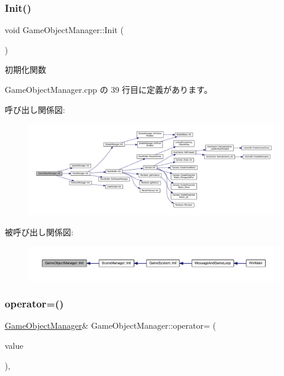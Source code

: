 \subsubsection{\texorpdfstring{Init()}{Init()}}
{\footnotesize\ttfamily void Game\+Object\+Manager\+::\+Init (\begin{DoxyParamCaption}{ }\end{DoxyParamCaption})\hspace{0.3cm}{\ttfamily [static]}}



初期化関数 



 Game\+Object\+Manager.\+cpp の 39 行目に定義があります。

呼び出し関係図\+:
\nopagebreak
\begin{figure}[H]
\begin{center}
\leavevmode
\includegraphics[width=350pt]{class_game_object_manager_abda84aa3b4c79090c43243f93b5a9c46_cgraph}
\end{center}
\end{figure}
被呼び出し関係図\+:
\nopagebreak
\begin{figure}[H]
\begin{center}
\leavevmode
\includegraphics[width=350pt]{class_game_object_manager_abda84aa3b4c79090c43243f93b5a9c46_icgraph}
\end{center}
\end{figure}
\mbox{\label{class_game_object_manager_af66275734b2098dc631fdb789d31fd52}} 
\subsubsection{\texorpdfstring{operator=()}{operator=()}}
{\footnotesize\ttfamily \mbox{\hyperlink{class_game_object_manager}{Game\+Object\+Manager}}\& Game\+Object\+Manager\+::operator= (\begin{DoxyParamCaption}\item[{const \mbox{\hyperlink{class_game_object_manager}{Game\+Object\+Manager}} \&}]{value }\end{DoxyParamCaption})\hspace{0.3cm}{\ttfamily [private]}, {\ttfamily [delete]}}



